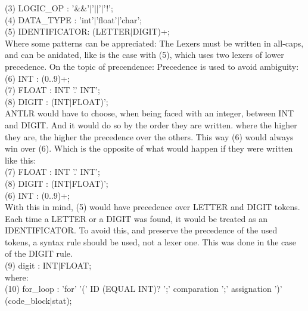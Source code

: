 \documentclass[twocolumn,10ptr]{article}
\begin{document}
	(3) LOGIC\_OP : '\&\&'\(\mid\)'\(\mid\)\(\mid\)'\(\mid\)'!'; \\
	
	(4)  DATA\_TYPE : 'int'\(\mid\)'float'\(\mid\)'char';\\
	
	(5)  IDENTIFICATOR: (LETTER\(\mid\)DIGIT)+;\\
	
	Where some patterns can be appreciated: The Lexers must be written in all-caps, and can be anidated, like is the case with (5), which uses two lexers of lower precedence.
	On the topic of precendence: Precedence is used to avoid ambiguity:\\
	
	
	(6)  INT : (0..9)+;\\
	
	(7)  FLOAT : INT '.' INT';\\
	
	(8)  DIGIT : (INT\(\mid\)FLOAT)';\\
	
	ANTLR would have to choose, when being faced with an integer, between INT and DIGIT. And it would do so by the order they are written. where the higher they are, the higher the precedence over the others. This way (6) would always win over (6). Which is the opposite of what would happen if they were written like this:\\
	
	
	(7)  FLOAT : INT '.' INT';\\
	
	(8)  DIGIT : (INT\(\mid\)FLOAT)';\\
	
	(6)  INT : (0..9)+;\\
	
	With this in mind, (5) would have precedence over LETTER and DIGIT tokens. Each time a LETTER or a DIGIT was found, it would be treated as an IDENTIFICATOR.
	To avoid this, and preserve the precedence of the used tokens, a syntax rule should be used, not a lexer one. This was done in the case of the DIGIT rule.\\
	
	(9)  digit : INT\(\mid\)FLOAT;\\
	
	where:\\
	
	(10) for\_loop :  'for' '(' ID (EQUAL INT)? ';' comparation ';' assignation ')' (code\_block\(\mid\)stat);\\
	
\end{document}
